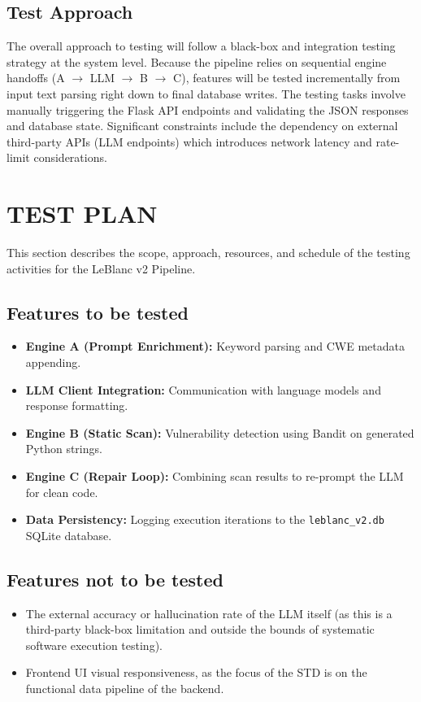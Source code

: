 \documentclass[12pt, a4paper]{article}
\begin{document}
\subsection{Test Approach}
The overall approach to testing will follow a black-box and integration testing strategy at the system level. Because the pipeline relies on sequential engine handoffs (A $\rightarrow$ LLM $\rightarrow$ B $\rightarrow$ C), features will be tested incrementally from input text parsing right down to final database writes. The testing tasks involve manually triggering the Flask API endpoints and validating the JSON responses and database state. Significant constraints include the dependency on external third-party APIs (LLM endpoints) which introduces network latency and rate-limit considerations.

\section{TEST PLAN}
This section describes the scope, approach, resources, and schedule of the testing activities for the LeBlanc v2 Pipeline.

\subsection{Features to be tested}
\begin{itemize}
    \item \textbf{Engine A (Prompt Enrichment):} Keyword parsing and CWE metadata appending.
    \item \textbf{LLM Client Integration:} Communication with language models and response formatting.
    \item \textbf{Engine B (Static Scan):} Vulnerability detection using Bandit on generated Python strings.
    \item \textbf{Engine C (Repair Loop):} Combining scan results to re-prompt the LLM for clean code.
    \item \textbf{Data Persistency:} Logging execution iterations to the \texttt{leblanc\_v2.db} SQLite database.
\end{itemize}

\subsection{Features not to be tested}
\begin{itemize}
    \item The external accuracy or hallucination rate of the LLM itself (as this is a third-party black-box limitation and outside the bounds of systematic software execution testing).
    \item Frontend UI visual responsiveness, as the focus of the STD is on the functional data pipeline of the backend.
\end{itemize}
\end{document}
